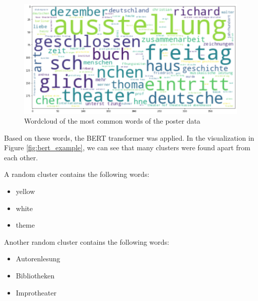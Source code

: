 \documentclass[conference]{IEEEtran}
\begin{document}
\begin{figure}
\centering
\includegraphics[width=1\linewidth]{../Imgs/wordcloud}
\caption{Wordcloud of the most common words of the poster data}
\label{fig:wordcloud}
\end{figure}

Based on these words, the BERT transformer was applied. In the visualization in Figure \ref{fig:bert_example}, we can see that many clusters were found apart from each other.

A random cluster contains the following words:

\begin{itemize}
\item yellow
\item white
\item theme
\end{itemize} 

Another random cluster contains the following words:

\begin{itemize}
\item Autorenlesung
\item Bibliotheken
\item Improtheater
\end{itemize}
\end{document}
